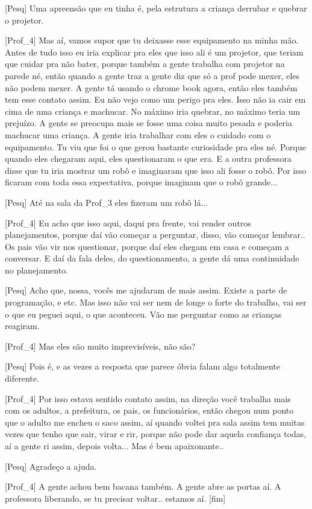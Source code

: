 [Pesq] Uma apreensão que eu tinha é, pela estrutura a criança derrubar e quebrar o projetor.

[Prof\_4] Mas aí, vamos supor que tu deixasse esse equipamento na minha mão. Antes de tudo isso eu iria explicar pra eles que isso ali é um projetor, que teriam que cuidar pra não bater, porque também a gente trabalha com projetor na parede né, então quando a gente traz a gente diz que só a prof pode mexer, eles não podem mexer. A gente tá usando o chrome book agora, então eles também tem esse contato assim. Eu não vejo como um perigo pra eles. Isso não ia cair em cima de uma criança e machucar. No máximo iria quebrar, no máximo teria um prejuízo. A gente se preocupa mais se fosse uma coisa muito pesada e poderia machucar uma criança. A gente iria trabalhar com eles o cuidado com o equipamento. Tu viu que foi o que gerou bastante curiosidade pra eles né. Porque quando eles chegaram aqui, eles questionaram o que era. E a outra professora disse que tu iria mostrar um robô e imaginaram que isso ali fosse o robô. Por isso ficaram com toda essa expectativa, porque imaginam que o robô grande... 

[Pesq] Até na sala da Prof\_3 eles fizeram um robô lá... 

[Prof\_4] Eu acho que isso aqui, daqui pra frente, vai render outros planejamentos, porque daí vão começar a perguntar, disso, vão começar lembrar.. Os pais vão vir nos questionar, porque daí eles chegam em casa e começam a conversar. E daí da fala deles, do questionamento, a gente dá uma continuidade no planejamento. 

[Pesq] Acho que, nossa, vocês me ajudaram de mais assim. Existe a parte de programação, e etc. Mas isso não vai ser nem de longe o forte do trabalho, vai ser o que eu peguei aqui, o que aconteceu. Vão me perguntar como as crianças reagiram.

[Prof\_4] Mas eles são muito imprevisíveis, não são?

[Pesq] Pois é, e as vezes a resposta que parece óbvia falam algo totalmente diferente.

[Prof\_4] Por isso estava sentido contato assim, na direção você trabalha mais com os adultos, a prefeitura, os pais, os funcionários, então chegou num ponto que o adulto me encheu o saco assim, aí quando voltei pra sala assim tem muitas vezes que tenho que sair, virar e rir, porque não pode dar aquela confiança todas, aí a gente ri assim, depois volta... Mas é bem apaixonante..

[Pesq] Agradeço a ajuda.

[Prof\_4] A gente achou bem bacana também. A gente abre as portas aí. A professora liberando, se tu precisar voltar.. estamos aí.
[fim]